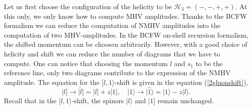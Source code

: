 Let us first choose the configuration of the helicity to be $\mathcal{H}_3=(-,-,+,+)$. At this only, we only know how to compute MHV amplitudes. Thanks to the BCFW formalism we can reduce the computation of NMHV amplitudes into the computation of two MHV-amplitudes. In the BCFW on-shell recursion formalism, the shifted momentum can be choosen arbitrarily. However, with a good choice of helicity and shift we can reduce the number of diagrams that we have to compute. One can notice that choosing the momentum $l$ and $s_1$ to be the reference line, only two diagrams contribute to the expression of the NMHV amplitude. The equation for the $[l,1\rangle$-shift is given in the equation (\ref{2gluonshift}),
\begin{equation}
\vert l] \longrightarrow \vert \hat{l}] =\vert l]+z\vert 1], \quad \vert 1\rangle \longrightarrow \vert \hat{1} \rangle =\vert 1\rangle -z\vert l\rangle .
\label{2gluonshift}
\end{equation}
Recall that in the $[l,1\rangle$-shift, the spinors $\vert l\rangle$ and $\vert 1]$ remain unchanged.
